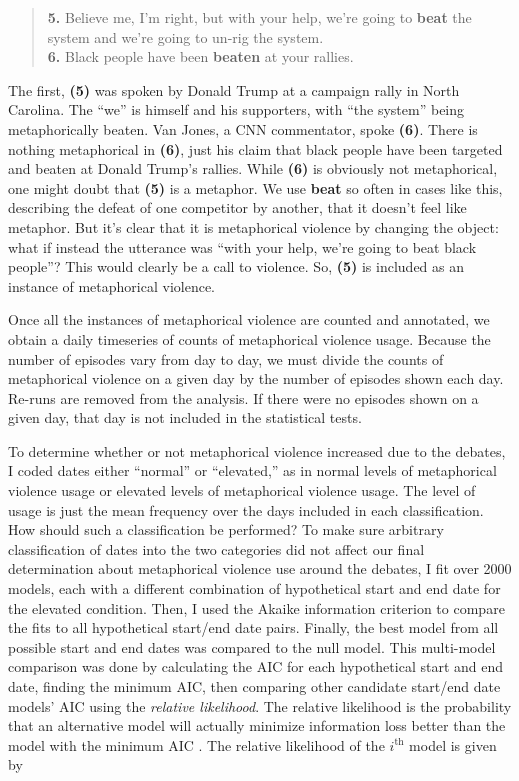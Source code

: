 \begin{quotation}
  \noindent
  \textbf{5.} Believe me, I'm right, but with your help, we're going to \textbf{beat} 
    the system and we're going to un-rig the system.\\
  \textbf{6.} Black people have been \textbf{beaten} at your rallies.
\end{quotation}

\noindent
The first, \textbf{(5)} was spoken by Donald Trump at a campaign rally in 
North Carolina. The ``we'' is himself and his supporters, with ``the system''
being metaphorically beaten. Van Jones, a CNN commentator, spoke \textbf{(6)}.
There is nothing metaphorical in \textbf{(6)}, just his claim that black people have been
targeted and beaten at Donald Trump's rallies. While \textbf{(6)} is obviously
not metaphorical, one might doubt that \textbf{(5)} is a metaphor.
We use \textbf{beat} so often in cases like this, describing the defeat
of one competitor by another, that it doesn't feel like metaphor. But it's clear
that it is metaphorical violence by changing the object: what if instead the
utterance was ``with your help, we're going to beat black people''? This would
clearly be a call to violence. So, \textbf{(5)} is included as an instance of
metaphorical violence.

Once all the instances of metaphorical violence are counted and annotated, we
obtain a daily timeseries of counts of metaphorical violence usage. Because 
the number of episodes vary from day to day, we must divide the counts of
metaphorical violence on a given day by the number of episodes shown each day.
Re-runs are removed from the analysis. If there were no episodes shown on
a given day, that day is not included in the statistical tests. 

To determine whether or not metaphorical violence increased due to the debates,
I coded dates either ``normal'' or ``elevated,'' as in normal
levels of metaphorical violence usage or elevated levels of metaphorical violence
usage. The level of usage is just the mean frequency over the days included
in each classification. How should such a classification be performed? To 
make sure arbitrary classification of dates into the two categories did not
affect our final determination about metaphorical violence use around the 
debates, I fit over 2000 models, each with a different combination of hypothetical
start and end date for the elevated condition. Then, I used the Akaike information
criterion to compare the fits to all hypothetical start/end date pairs. Finally,
the best model from all possible start and end dates was compared to the null
model. This multi-model comparison was done by calculating the AIC for each
hypothetical start and end date, finding the minimum AIC, then comparing other
candidate start/end date models' AIC using the \textit{relative likelihood}. 
The relative likelihood is the probability that an alternative model
will actually minimize information loss better than the model with the minimum
AIC \cite{Burnham2011}. The relative likelihood of the $i^{\mathrm{th}}$ model is given by

